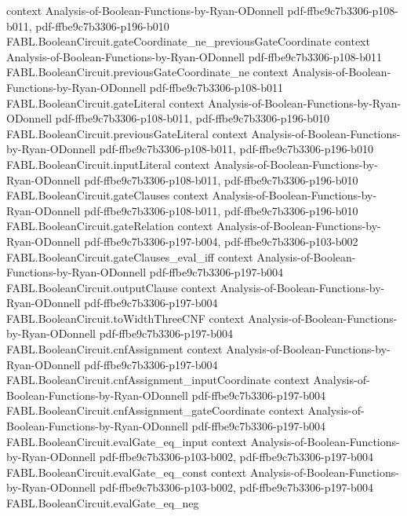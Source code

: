 \begin{theorem}
  {context}
  {Analysis-of-Boolean-Functions-by-Ryan-ODonnell}
  {pdf-ffbe9c7b3306-p108-b011,
    pdf-ffbe9c7b3306-p196-b010}
\proofstep
  {FABL.BooleanCircuit.gateCoordinate_ne_previousGateCoordinate}
  {context}
  {Analysis-of-Boolean-Functions-by-Ryan-ODonnell}
  {pdf-ffbe9c7b3306-p108-b011}
\proofstep
  {FABL.BooleanCircuit.previousGateCoordinate_ne}
  {context}
  {Analysis-of-Boolean-Functions-by-Ryan-ODonnell}
  {pdf-ffbe9c7b3306-p108-b011}
\proofstep
  {FABL.BooleanCircuit.gateLiteral}
  {context}
  {Analysis-of-Boolean-Functions-by-Ryan-ODonnell}
  {pdf-ffbe9c7b3306-p108-b011,
    pdf-ffbe9c7b3306-p196-b010}
\proofstep
  {FABL.BooleanCircuit.previousGateLiteral}
  {context}
  {Analysis-of-Boolean-Functions-by-Ryan-ODonnell}
  {pdf-ffbe9c7b3306-p108-b011,
    pdf-ffbe9c7b3306-p196-b010}
\proofstep
  {FABL.BooleanCircuit.inputLiteral}
  {context}
  {Analysis-of-Boolean-Functions-by-Ryan-ODonnell}
  {pdf-ffbe9c7b3306-p108-b011,
    pdf-ffbe9c7b3306-p196-b010}
\proofstep
  {FABL.BooleanCircuit.gateClauses}
  {context}
  {Analysis-of-Boolean-Functions-by-Ryan-ODonnell}
  {pdf-ffbe9c7b3306-p108-b011,
    pdf-ffbe9c7b3306-p196-b010}
\proofstep
  {FABL.BooleanCircuit.gateRelation}
  {context}
  {Analysis-of-Boolean-Functions-by-Ryan-ODonnell}
  {pdf-ffbe9c7b3306-p197-b004,
    pdf-ffbe9c7b3306-p103-b002}
\proofstep
  {FABL.BooleanCircuit.gateClauses_eval_iff}
  {context}
  {Analysis-of-Boolean-Functions-by-Ryan-ODonnell}
  {pdf-ffbe9c7b3306-p197-b004}
\proofstep
  {FABL.BooleanCircuit.outputClause}
  {context}
  {Analysis-of-Boolean-Functions-by-Ryan-ODonnell}
  {pdf-ffbe9c7b3306-p197-b004}
\proofstep
  {FABL.BooleanCircuit.toWidthThreeCNF}
  {context}
  {Analysis-of-Boolean-Functions-by-Ryan-ODonnell}
  {pdf-ffbe9c7b3306-p197-b004}
\proofstep
  {FABL.BooleanCircuit.cnfAssignment}
  {context}
  {Analysis-of-Boolean-Functions-by-Ryan-ODonnell}
  {pdf-ffbe9c7b3306-p197-b004}
\proofstep
  {FABL.BooleanCircuit.cnfAssignment_inputCoordinate}
  {context}
  {Analysis-of-Boolean-Functions-by-Ryan-ODonnell}
  {pdf-ffbe9c7b3306-p197-b004}
\proofstep
  {FABL.BooleanCircuit.cnfAssignment_gateCoordinate}
  {context}
  {Analysis-of-Boolean-Functions-by-Ryan-ODonnell}
  {pdf-ffbe9c7b3306-p197-b004}
\proofstep
  {FABL.BooleanCircuit.evalGate_eq_input}
  {context}
  {Analysis-of-Boolean-Functions-by-Ryan-ODonnell}
  {pdf-ffbe9c7b3306-p103-b002,
    pdf-ffbe9c7b3306-p197-b004}
\proofstep
  {FABL.BooleanCircuit.evalGate_eq_const}
  {context}
  {Analysis-of-Boolean-Functions-by-Ryan-ODonnell}
  {pdf-ffbe9c7b3306-p103-b002,
    pdf-ffbe9c7b3306-p197-b004}
\proofstep
  {FABL.BooleanCircuit.evalGate_eq_neg}

\end{theorem}
